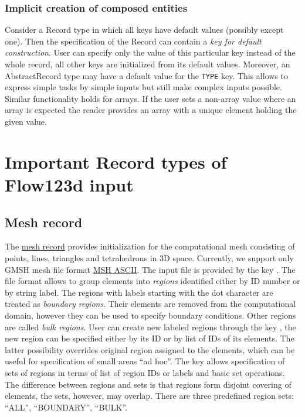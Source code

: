 \subsubsection{Implicit creation of composed entities}
Consider a Record type in which all keys have default values (possibly except one). Then the specification
of the Record can contain a {\it key for default construction}. User can specify only the value of this particular key instead of the whole record, all other keys are initialized from its default values.
Moreover, an AbstractRecord type may have a default value for the \verb'TYPE' key.
This allows to express simple tasks by simple inputs but still make complex inputs possible. 
Similar functionality holds for arrays. If the user sets a non-array value where an array is expected the reader provides an array with a unique element holding the given value.


\section{Important Record types of Flow123d input}


\subsection{Mesh record}
\label{sec:Mesh}
The \hyperlink{IT::Mesh}{mesh record} provides initialization for the computational mesh consisting of points, lines, triangles and tetrahedrons in 3D space.
Currently, we support only GMSH mesh file format \href{http://geuz.org/gmsh/doc/texinfo/gmsh.html#MSH-ASCII-file-format}{MSH ASCII}. 
The input file is provided by the key . The file format allows to group elements into {\it regions} identified either by ID number or by string label. 
The regions with labels starting with the dot character are treated as {\it boundary regions}. Their elements are removed from the computational domain, however they can be used to specify boundary
conditions. Other regions are called {\it bulk regions}. User can create new labeled regions through the key 
, the new region can be specified either by its ID
or by list of IDs of its elements. The latter possibility overrides original region assigned to the elements, which can be useful for specification of small areas ``ad hoc''.
The key  allows specification of sets of regions in terms of list of region IDs or labels and basic set operations. The difference between regions and sets is that
regions form disjoint covering of elements, the sets, however, may overlap. There are three predefined region sets: ``ALL'', ``BOUNDARY'', ``BULK''.


